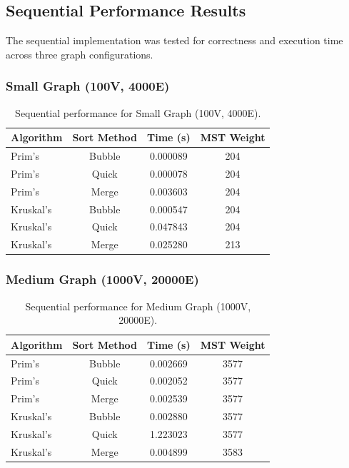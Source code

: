 \documentclass[11pt]{article}
\begin{document}
\subsection{Sequential Performance Results}
The sequential implementation was tested for correctness and execution time across three graph configurations.

\subsubsection*{Small Graph (100V, 4000E)}
\begin{table}[H]
    \centering
    \begin{tabular}{lccc}
        \toprule
        \textbf{Algorithm} & \textbf{Sort Method} & \textbf{Time (s)} & \textbf{MST Weight} \\
        \midrule
        Prim's    & Bubble & 0.000089 & 204 \\
        Prim's    & Quick  & 0.000078 & 204 \\
        Prim's    & Merge  & 0.003603 & 204 \\
        \midrule
        Kruskal's & Bubble & 0.000547 & 204 \\
        Kruskal's & Quick  & 0.047843 & 204 \\
        Kruskal's & Merge  & 0.025280 & 213 \\
        \bottomrule
    \end{tabular}
    \caption{Sequential performance for Small Graph (100V, 4000E).}
    \label{tab:small_seq}
\end{table}

\subsubsection*{Medium Graph (1000V, 20000E)}
\begin{table}[H]
    \centering
    \begin{tabular}{lccc}
        \toprule
        \textbf{Algorithm} & \textbf{Sort Method} & \textbf{Time (s)} & \textbf{MST Weight} \\
        \midrule
        Prim's    & Bubble & 0.002669 & 3577 \\
        Prim's    & Quick  & 0.002052 & 3577 \\
        Prim's    & Merge  & 0.002539 & 3577 \\
        \midrule
        Kruskal's & Bubble & 0.002880 & 3577 \\
        Kruskal's & Quick  & 1.223023 & 3577 \\
        Kruskal's & Merge  & 0.004899 & 3583 \\
        \bottomrule
    \end{tabular}
    \caption{Sequential performance for Medium Graph (1000V, 20000E).}
    \label{tab:medium_seq}
\end{table}
\end{document}
